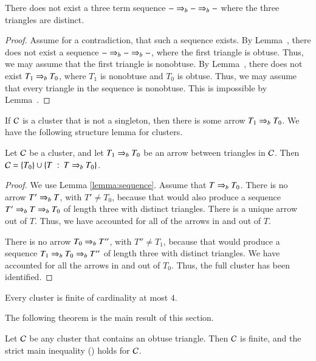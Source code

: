 \begin{lemma}  There does not exist a three
term sequence $- \Rightarrow_{b} -\Rightarrow_{b} -$ where  the three triangles  are distinct.
\end{lemma}

\begin{proof}  
Assume for a contradiction, that such a sequence exists.
By Lemma~, there does not exist a sequence $- \Rightarrow_{b} - \Rightarrow_{b} -$,
where the first triangle is obtuse.  Thus, we may assume that the first
triangle is nonobtuse.
By Lemma~, there does not exist $T_1\Rightarrow_{b} T_0$,
where $T_1$ is nonobtuse and $T_0$ is obtuse.  Thus, we may assume
that every triangle in the sequence is nonobtuse.  This is impossible by
Lemma~.
\end{proof}

If $\mathcal C$ is a cluster that is not a singleton, then there is
some arrow $T_1\Rightarrow_{b} T_0$.  We have the following structure
lemma for clusters.

\begin{lemma}
  Let $\mathcal C$ be a cluster, and let $T_1\Rightarrow_{b} T_0$ be an
  arrow between triangles in $\mathcal C$.
  Then $\mathcal C = \{T_0\}\cup \{T \ :\  T\Rightarrow_{b} T_0\}$.
\end{lemma}

\begin{proof}  
  We use Lemma \ref{lemma:sequence}.  Assume that $T\Rightarrow_{b} T_0$.  There
  is no arrow $T'\Rightarrow_{b} T$, with $T'\ne T_0$, because that would also
  produce a sequence $T' \Rightarrow_{b} T \Rightarrow_{b} T_0$ of length three with
  distinct triangles.  There is a unique arrow out of $T$.  Thus, we
  have accounted for all of the arrows in and out of $T$.

  There is no arrow $T_0\Rightarrow_{b} T''$, with $T''\ne T_1$, because that
  would produce a sequence $T_1\Rightarrow_{b} T_0\Rightarrow_{b} T''$ of length three with
  distinct triangles.  We have accounted for all the arrows in and
  out of $T_0$.  Thus, the full cluster has been identified.
\end{proof}

\begin{corollary}
  Every cluster is finite of cardinality at most $4$.
\end{corollary}


The following theorem is the main result of this
section.

\begin{theorem}  
  Let $\mathcal C$ be any cluster that contains an obtuse triangle.  Then $\mathcal C$
  is finite, and the strict main inequality ()
  holds for $\mathcal C$.
\end{theorem}

